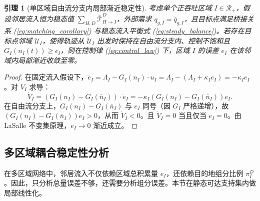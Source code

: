 \documentclass[a4paper,12pt]{article}
\theoremstyle{plain}
\newtheorem{lemma}[theorem]{引理}
\theoremstyle{definition}
\theoremstyle{remark}
\begin{document}
\begin{lemma}[单区域自由流分支内局部渐近稳定性]\label{lem:single_region}
考虑单个正吞吐区域 $I\in\mathcal R_+$，假设邻居流入恒为稳态值 $\sum_{H,D} \bar{\mathcal{T}}_{H \to I}^D$，外部需求 $q_{g,I} = \bar{q}_{g,I}$，且目标点满足桥接关系 (\ref{eq:matching_corollary}) 与稳态流入平衡式 (\ref{eq:steady_balance})。若存在目标点邻域 $\mathcal U_I$，使得轨迹从 $\mathcal U_I$ 出发时保持在自由流分支内、控制不饱和且 $G_I(n_I(t))\ge\epsilon_I$，则在控制律 (\ref{eq:control_law}) 下，区域 $I$ 的误差 $e_I$ 在该邻域内局部渐近收敛至零。
\end{lemma}

\begin{proof}
在固定流入假设下，$\dot{e}_I = \Lambda_I - G_I(n_I) \cdot u_I = \Lambda_I - (\Lambda_I + \kappa_I e_I) = -\kappa_I e_I$。对 $V_I$ 求导：
\begin{equation}
    \dot{V}_I = (G_I(n_I) - G_I(\bar{n}_I)) \cdot \dot{e}_I
    =
    -\kappa_I\left(G_I(n_I)-G_I(\bar n_I)\right)e_I .
\end{equation}
在自由流分支上，$G_I(n_I)-G_I(\bar n_I)$ 与 $e_I$ 同号（因 $G_I$ 严格递增），故 $\left(G_I(n_I)-G_I(\bar n_I)\right)e_I>0$，从而 $\dot{V}_I<0$。且 $\dot{V}_I = 0$ 当且仅当 $e_I = 0$。由 LaSalle 不变集原理，$e_I \to 0$ 渐近成立。
\end{proof}

\subsection{多区域耦合稳定性分析}

在多区域网络中，邻居流入不仅依赖区域总积累量 $e_I$，还依赖目的地组分比例 $\pi_I^D$。因此，只分析总量误差不够，还需要分析组分误差。本节在静态可达支持集内做局部线性化。
\end{document}
